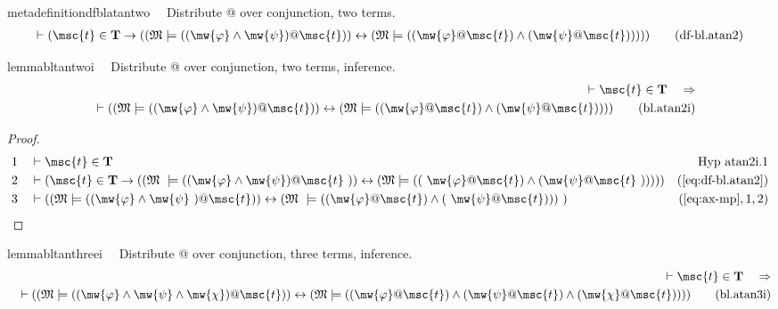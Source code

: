 \begin{restatable}{metadefinition}{dfblatantwo}~~ Distribute @ over conjunction, two
terms.
\begin{align}
\vdash ( \msc{t} \in \mathbf{T} \rightarrow ( ( \mathfrak{M} \models ( (
    \mw{\varphi} \wedge \mw{\psi} ) @ \msc{t} ) ) \leftrightarrow (
    \mathfrak{M} \models ( ( \mw{\varphi} @ \msc{t} ) \wedge ( \mw{\psi} @
    \msc{t} ) ) ) ) )\label{eq:df-bl.atan2}\tag{df-bl.atan2}
\end{align}
\end{restatable}

\begin{restatable}{lemma}{bltantwoi}~~ Distribute @ over conjunction, two terms,
inference.
\begin{align}
\vdash \msc{t} \in \mathbf{T}\quad\Rightarrow \notag \\ 
	\quad \vdash ( ( \mathfrak{M}
    \models ( ( \mw{\varphi} \wedge \mw{\psi} ) @ \msc{t} ) ) \leftrightarrow (
    \mathfrak{M} \models ( ( \mw{\varphi} @ \msc{t} ) \wedge ( \mw{\psi} @
    \msc{t} ) ) ) )\label{eq:bl.atan2i}\tag{bl.atan2i}
\end{align}
\end{restatable}

\begin{proof}
\begin{align}
  1 &&  & \vdash \msc{t} \in \mathbf{T}&\text{Hyp~atan2i.1}\notag%
  \\ 2 &&  & \vdash ( \msc{t} \in \mathbf{T} \rightarrow ( ( \mathfrak{M}
     ~\models ( ( \mw{\varphi} \wedge \mw{\psi} ) @ \msc{t}
     ~) ) \leftrightarrow ( \mathfrak{M} \models ( (
     ~\mw{\varphi} @ \msc{t} ) \wedge ( \mw{\psi} @ \msc{t}
     ~) ) ) ) )&(\mbox{\ref{eq:df-bl.atan2}})\notag
  \\ 3 &&  & \vdash ( ( \mathfrak{M} \models ( ( \mw{\varphi} \wedge \mw{\psi}
     ~) @ \msc{t} ) ) \leftrightarrow ( \mathfrak{M}
     ~\models ( ( \mw{\varphi} @ \msc{t} ) \wedge (
     ~\mw{\psi} @ \msc{t} ) ) )
     ~)&(\mbox{\ref{eq:ax-mp}},1,2)\notag
\end{align}
\end{proof}

\begin{restatable}{lemma}{bltanthreei}~~ Distribute @ over conjunction, three
terms, inference.
\begin{align}
\vdash \msc{t} \in \mathbf{T}\quad\Rightarrow \notag \\ 
	\quad \vdash ( ( \mathfrak{M}
    \models ( ( \mw{\varphi} \wedge \mw{\psi} \wedge \mw{\chi} ) @ \msc{t} ) )
    \leftrightarrow ( \mathfrak{M} \models ( ( \mw{\varphi} @ \msc{t} ) \wedge
    ( \mw{\psi} @ \msc{t} ) \wedge ( \mw{\chi} @ \msc{t} ) ) )
    )\label{eq:bl.atan3i}\tag{bl.atan3i}
\end{align}
\end{restatable}

